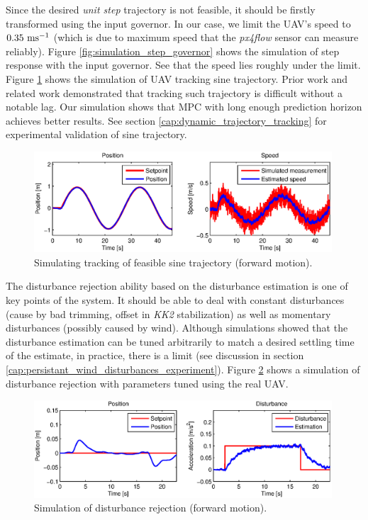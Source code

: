 Since the desired \emph{unit step} trajectory is not feasible, it should be firstly transformed using the input governor. In our case, we limit the UAV's speed to $0.35~\mathrm{ms^{-1}}$ (which is due to maximum speed that the \emph{px4flow} sensor can measure reliably). Figure \ref{fig:simulation_step_governor} shows the simulation of step response with the input governor. See that the speed lies roughly under the limit. Figure \ref{fig:simulation_sine} shows the simulation of UAV tracking sine trajectory. Prior work \citep{baca2013, endrych2014} and related work \citep{bangura2014realtimempc} demonstrated that tracking such trajectory is difficult without a notable lag. Our simulation shows that MPC with long enough prediction horizon achieves better results. See section \ref{cap:dynamic_trajectory_tracking} for experimental validation of sine trajectory.

\begin{figure}[H]
\centering
\includegraphics[width=0.99\textwidth]{fig/simulation3_sine.eps}
\caption{Simulating tracking of feasible sine trajectory (forward motion).}
\label{fig:simulation_sine}
\end{figure}

The disturbance rejection ability based on the disturbance estimation is one of key points of the system. It should be able to deal with constant disturbances (cause by bad trimming, offset in \emph{KK2} stabilization) as well as momentary disturbances (possibly caused by wind). Although simulations showed that the disturbance estimation can be tuned arbitrarily to match a desired settling time of the estimate, in practice, there is a limit (see discussion in section \ref{cap:persistant_wind_disturbances_experiment}). Figure \ref{fig:simulation_disturbance_rejection} shows a simulation of disturbance rejection with parameters tuned using the real UAV.

\begin{figure}[H]
\centering
\includegraphics[width=0.99\textwidth]{fig/simulation4_disturbance_rejection.eps}
\caption{Simulation of disturbance rejection (forward motion).}
\label{fig:simulation_disturbance_rejection}
\end{figure}

